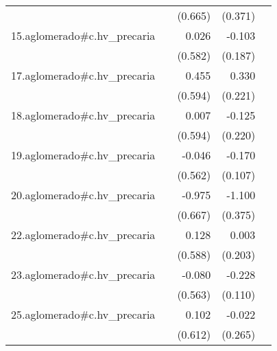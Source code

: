 {\begin{longtable}{l*{4}{D{.}{.}{-1}}}
            &                     &     (0.665)         &     (0.371)         &                     \\
\addlinespace
15.aglomerado#c.hv\_precaria&                     &       0.026         &      -0.103         &                     \\
            &                     &     (0.582)         &     (0.187)         &                     \\
\addlinespace
17.aglomerado#c.hv\_precaria&                     &       0.455         &       0.330         &                     \\
            &                     &     (0.594)         &     (0.221)         &                     \\
\addlinespace
18.aglomerado#c.hv\_precaria&                     &       0.007         &      -0.125         &                     \\
            &                     &     (0.594)         &     (0.220)         &                     \\
\addlinespace
19.aglomerado#c.hv\_precaria&                     &      -0.046         &      -0.170         &                     \\
            &                     &     (0.562)         &     (0.107)         &                     \\
\addlinespace
20.aglomerado#c.hv\_precaria&                     &      -0.975         &      -1.100\sym{**} &                     \\
            &                     &     (0.667)         &     (0.375)         &                     \\
\addlinespace
22.aglomerado#c.hv\_precaria&                     &       0.128         &       0.003         &                     \\
            &                     &     (0.588)         &     (0.203)         &                     \\
\addlinespace
23.aglomerado#c.hv\_precaria&                     &      -0.080         &      -0.228\sym{*}  &                     \\
            &                     &     (0.563)         &     (0.110)         &                     \\
\addlinespace
25.aglomerado#c.hv\_precaria&                     &       0.102         &      -0.022         &                     \\
            &                     &     (0.612)         &     (0.265)         &                     \\

\end{longtable}}
